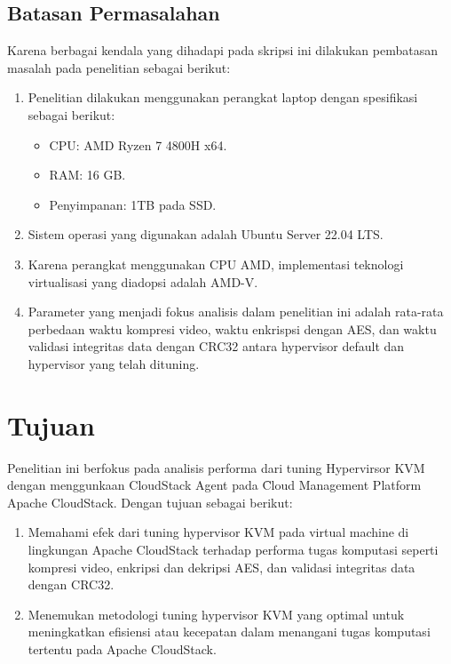 \subsection{Batasan Permasalahan}
Karena berbagai kendala yang dihadapi pada skripsi ini dilakukan pembatasan masalah pada penelitian  sebagai berikut:
\begin{enumerate}
      \item Penelitian dilakukan menggunakan perangkat laptop dengan spesifikasi sebagai berikut:
            \begin{itemize}
                  \item CPU: AMD Ryzen 7 4800H x64.
                  \item RAM: 16 GB.
                  \item Penyimpanan: 1TB pada SSD.
            \end{itemize}
      \item Sistem operasi yang digunakan adalah Ubuntu Server 22.04 LTS.
      \item Karena perangkat menggunakan CPU AMD, implementasi teknologi virtualisasi yang diadopsi adalah AMD-V.
      \item Parameter yang menjadi fokus analisis dalam penelitian ini adalah rata-rata perbedaan waktu kompresi video, waktu enkrispsi dengan AES, dan waktu validasi integritas data dengan CRC32 antara hypervisor default dan hypervisor yang telah dituning.
\end{enumerate}


\section{Tujuan}
Penelitian ini berfokus pada analisis performa dari tuning Hypervirsor KVM dengan menggunkaan CloudStack Agent pada \f{Cloud Management Platform} Apache CloudStack. Dengan tujuan sebagai berikut:

\begin{enumerate}
      \item  Memahami efek dari tuning hypervisor KVM pada virtual machine di lingkungan Apache CloudStack terhadap performa tugas komputasi seperti kompresi video, enkripsi dan dekripsi AES, dan validasi integritas data dengan CRC32.

      \item Menemukan metodologi tuning hypervisor KVM yang optimal untuk meningkatkan efisiensi atau kecepatan dalam menangani tugas komputasi tertentu pada Apache CloudStack.

\end{enumerate}

